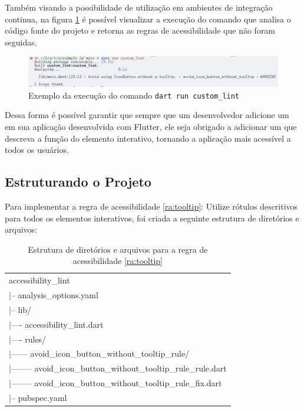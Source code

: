 Também visando a possibilidade de utilização em ambientes de integração continua, na figura \ref{fig:exmplo-comando-erro} é possível visualizar a execução do comando  que analisa o código fonte do projeto e retorna as regras de acessibilidade que não foram seguidas.

\begin{figure}[!ht]
	\centering
	\caption{Exemplo da execução do comando \texttt{dart run custom\_lint}}\label{fig:exmplo-comando-erro}
	\includegraphics[width=425pt]{Assets/PrintComandoCustomLint.png}
\end{figure}

Dessa forma é possível garantir que sempre que um desenvolvedor adicione um  em sua aplicação desenvolvida com Flutter, ele seja obrigado a adicionar um  que descreva a função do elemento interativo, tornando a aplicação mais acessível a todos os usuários.

\subsection{Estruturando o Projeto}

Para implementar a regra de acessibilidade \ref{ra:tooltip}: Utilize rótulos descritivos para todos os elementos interativos, foi criada a seguinte estrutura de diretórios e arquivos:

\begin{table}[!htbp]
	\centering
	\renewcommand{\arraystretch}{1.1}
	\caption{Estrutura de diretórios e arquivos para a regra de acessibilidade \ref{ra:tooltip}}
	\label{tab:estrutura-diretorios-arquivos-ra1}
	\ttfamily
	\begin{tabular}{ L{12cm} }
		\hline
		accessibility\_lint \\
		|-- analysis\_options.yaml \\
		|-- lib/ \\
		|---- accessibility\_lint.dart \\
		|---- rules/ \\
		|------ avoid\_icon\_button\_without\_tooltip\_rule/ \\
		|-------- avoid\_icon\_button\_without\_tooltip\_rule\_rule.dart \\
		|-------- avoid\_icon\_button\_without\_tooltip\_rule\_fix.dart \\
		|-- pubspec.yaml \\
		\hline
	\end{tabular}
	\fontfamily{\rmdefault}\selectfont
	\vspace{2mm}
\end{table}

